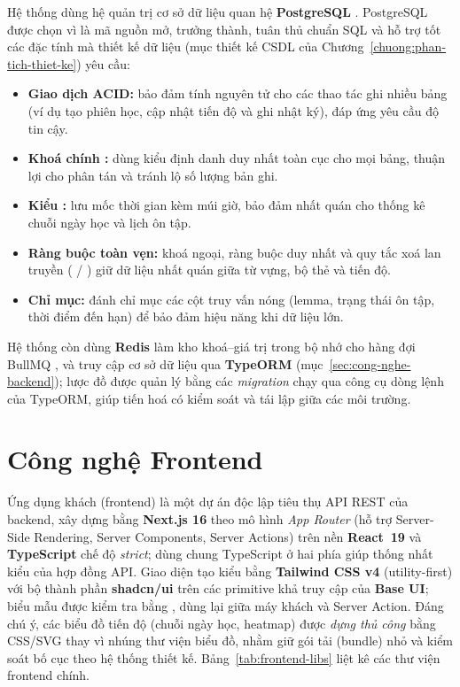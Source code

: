Hệ thống dùng hệ quản trị cơ sở dữ liệu quan hệ \textbf{PostgreSQL}
\cite{postgresql2024}. PostgreSQL được chọn vì là mã nguồn mở, trưởng thành,
tuân thủ chuẩn SQL và hỗ trợ tốt các đặc tính mà thiết kế dữ liệu
(mục thiết kế CSDL của Chương~\ref{chuong:phan-tich-thiet-ke}) yêu cầu:

\begin{itemize}
  \item \textbf{Giao dịch ACID:} bảo đảm tính nguyên tử cho các thao tác
        ghi nhiều bảng (ví dụ tạo phiên học, cập nhật tiến độ và ghi nhật
        ký), đáp ứng yêu cầu độ tin cậy.
  \item \textbf{Khoá chính :} dùng kiểu định danh duy nhất toàn
        cục cho mọi bảng, thuận lợi cho phân tán và tránh lộ số lượng bản ghi.
  \item \textbf{Kiểu :} lưu mốc thời gian kèm múi giờ,
        bảo đảm nhất quán cho thống kê chuỗi ngày học và lịch ôn tập.
  \item \textbf{Ràng buộc toàn vẹn:} khoá ngoại, ràng buộc duy nhất và quy
        tắc xoá lan truyền ( / ) giữ dữ liệu
        nhất quán giữa từ vựng, bộ thẻ và tiến độ.
  \item \textbf{Chỉ mục:} đánh chỉ mục các cột truy vấn nóng (lemma, trạng
        thái ôn tập, thời điểm đến hạn) để bảo đảm hiệu năng khi dữ liệu lớn.
\end{itemize}

Hệ thống còn dùng \textbf{Redis} làm kho khoá--giá trị trong bộ nhớ cho hàng
đợi BullMQ \cite{redis2024}, và truy cập cơ sở dữ liệu qua \textbf{TypeORM}
\cite{typeorm2024} (mục~\ref{sec:cong-nghe-backend}); lược đồ được quản lý
bằng các \textit{migration} chạy qua công cụ dòng lệnh của TypeORM, giúp tiến
hoá có kiểm soát và tái lập giữa các môi trường.

\section{Công nghệ Frontend}
\label{sec:cong-nghe-frontend}

Ứng dụng khách (frontend) là một dự án độc lập tiêu thụ API REST của backend,
xây dựng bằng \textbf{Next.js 16} theo mô hình \textit{App Router} (hỗ trợ
Server-Side Rendering, Server Components, Server Actions) \cite{nextjs2024}
trên nền \textbf{React~19} \cite{react2024} và \textbf{TypeScript} chế độ
\textit{strict}; dùng chung TypeScript ở hai phía giúp thống nhất kiểu của
hợp đồng API. Giao diện tạo kiểu bằng \textbf{Tailwind CSS v4} (utility-first)
\cite{tailwind2024} với bộ thành phần \textbf{shadcn/ui} trên các primitive
khả truy cập của \textbf{Base UI}; biểu mẫu được kiểm tra bằng 
\cite{zod2024}, dùng lại giữa máy khách và Server Action. Đáng chú ý, các
biểu đồ tiến độ (chuỗi ngày học, heatmap) được \textit{dựng thủ công} bằng
CSS/SVG thay vì nhúng thư viện biểu đồ, nhằm giữ gói tải (bundle) nhỏ và kiểm
soát bố cục theo hệ thống thiết kế. Bảng~\ref{tab:frontend-libs} liệt kê các
thư viện frontend chính.

